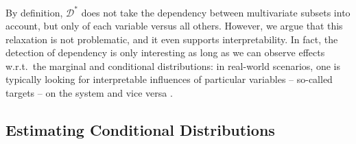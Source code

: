 By definition, $\mathcal{D}^*$ does not take the dependency between multivariate subsets into account, but only of each variable versus all others. 
However, we argue that this relaxation is not problematic, and it even supports interpretability.  
In fact, the detection of dependency is only interesting as long as we can observe effects w.r.t.\ the marginal and conditional distributions: in real-world scenarios, one is typically looking for interpretable influences of particular variables -- so-called targets -- on the system and vice versa \cite{DBLP:books/lib/HastieTF09}.

\subsection{Estimating Conditional Distributions}
\label{sec:slicing}

